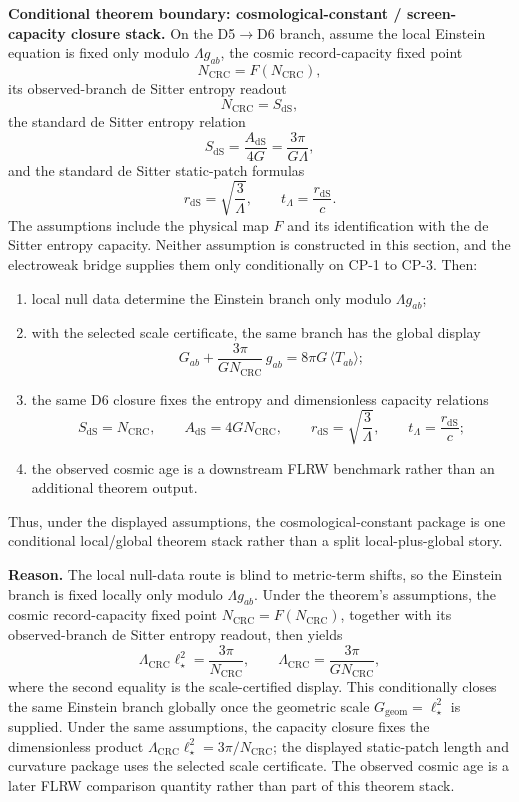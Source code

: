 \textbf{Conditional theorem boundary: cosmological-constant / screen-capacity closure stack.}
On the D5\(\to\)D6 branch, assume the local Einstein equation is fixed only modulo \(\Lambda g_{ab}\), the cosmic record-capacity fixed point
\[
N_{\mathrm{CRC}}=F(N_{\mathrm{CRC}}),
\]
its observed-branch de Sitter entropy readout
\[
N_{\mathrm{CRC}}=S_{\mathrm{dS}},
\]
\noindent the standard de Sitter entropy relation
\[
S_{\mathrm{dS}}=\frac{A_{\mathrm{dS}}}{4G}=\frac{3\pi}{G\Lambda},
\]
and the standard de Sitter static-patch formulas
\[
r_{\mathrm{dS}}=\sqrt{\frac{3}{\Lambda}},
\qquad
t_\Lambda=\frac{r_{\mathrm{dS}}}{c}.
\]
The assumptions include the physical map \(F\) and its identification with the de Sitter entropy
capacity. Neither assumption is constructed in this section, and the electroweak bridge supplies
them only conditionally on CP-1 to CP-3.
Then:
\begin{enumerate}[leftmargin=2em]
\item local null data determine the Einstein branch only modulo \(\Lambda g_{ab}\);
\item with the selected scale certificate, the same branch has the global display
\[
G_{ab}+\frac{3\pi}{G N_{\mathrm{CRC}}}\,g_{ab}=8\pi G\,\langle T_{ab}\rangle;
\]
\item the same D6 closure fixes the entropy and dimensionless capacity relations
\[
S_{\mathrm{dS}}=N_{\mathrm{CRC}},
\qquad
A_{\mathrm{dS}}=4G N_{\mathrm{CRC}},
\qquad
r_{\mathrm{dS}}=\sqrt{\frac{3}{\Lambda}},
\qquad
t_\Lambda=\frac{r_{\mathrm{dS}}}{c};
\]
\item the observed cosmic age is a downstream FLRW benchmark rather than an additional theorem output.
\end{enumerate}
Thus, under the displayed assumptions, the cosmological-constant package is one conditional
local/global theorem stack rather than a split local-plus-global story.

\textbf{Reason.}
The local null-data route is blind to metric-term shifts, so the Einstein branch is fixed locally
only modulo \(\Lambda g_{ab}\). Under the theorem's assumptions, the cosmic record-capacity fixed point
\(N_{\mathrm{CRC}}=F(N_{\mathrm{CRC}})\), together with its observed-branch de Sitter entropy
readout, then yields
\[
\Lambda_{\mathrm{CRC}}\ell_\star^2=\frac{3\pi}{N_{\mathrm{CRC}}},
\qquad
\Lambda_{\mathrm{CRC}}=\frac{3\pi}{G N_{\mathrm{CRC}}},
\]
where the second equality is the scale-certified display. This conditionally closes the same Einstein branch globally once the geometric scale
\(G_{\mathrm{geom}}=\ell_\star^2\) is supplied. Under the same assumptions, the capacity closure fixes the
dimensionless product \(\Lambda_{\mathrm{CRC}}\ell_\star^2=3\pi/N_{\mathrm{CRC}}\); the displayed
static-patch length and curvature package uses the selected scale certificate. The observed cosmic age is
a later FLRW comparison quantity rather than part of this theorem stack.

